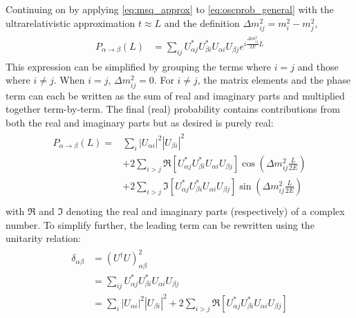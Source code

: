 Continuing on by applying \cref{eq:msq_approx} to \cref{eq:oscprob_general}
with the ultrarelativistic approximation $t \approx L$
and the definition $\Delta m^2_{ij} = m_i^2 - m_j^2$,
\begin{align}\label{eq:oscprob_general_2}
    \begin{split}
        P_{\alpha\to\beta}(L)
        &= \sum_{ij} U^*_{\alpha j} U^*_{\beta i} U_{\alpha i} U_{\beta j}
        e^{i\frac{\Delta m^2_{ij}}{2E}L}
    \end{split}
\end{align}
This expression can be simplified by grouping the terms where $i=j$
and those where $i\neq j$.
When $i=j$, $\Delta m^2_{ij} = 0$.
For $i\neq j$, the matrix elements and the phase term can each be written
as the sum of real and imaginary parts and multiplied together term-by-term.
The final (real) probability contains contributions from both
the real and imaginary parts but as desired is purely real:
\begin{align}\label{eq:oscprob_general_3}
    \begin{split}
        P_{\alpha\to\beta}(L) =
        & \sum_i \left|U_{\alpha i}\right|^2 \left|U_{\beta i}\right|^2 \\
        & + 2\sum_{i>j} \Re \left[
            U^*_{\alpha j} U^*_{\beta i} U_{\alpha i} U_{\beta j}
        \right]
        \cos\left(\Delta m^2_{ij}\frac{L}{2E}\right) \\
        & + 2\sum_{i>j} \Im \left[
            U^*_{\alpha j} U^*_{\beta i} U_{\alpha i} U_{\beta j}
        \right]
        \sin\left(\Delta m^2_{ij}\frac{L}{2E}\right) \\
    \end{split}
\end{align}
with $\Re$ and $\Im$ denoting the real and imaginary parts (respectively)
of a complex number.
To simplify further, the leading term can be rewritten
using the unitarity relation:
\begin{align}\label{eq:sub_unitarity}
    \begin{split}
        \delta_{\alpha\beta}
        &= (U^\dagger U)^2_{\alpha\beta} \\
        &= \sum_{ij} U^*_{\alpha j} U^*_{\beta i} U_{\alpha i} U_{\beta j} \\
        &= \sum_i \left|U_{\alpha i}\right|^2 \left|U_{\beta i}\right|^2
        + 2\sum_{i>j} \Re \left[
            U^*_{\alpha j} U^*_{\beta i} U_{\alpha i} U_{\beta j}
        \right]
    \end{split}
\end{align}
